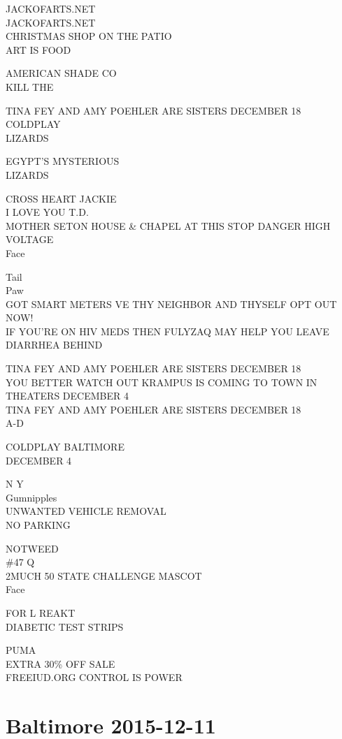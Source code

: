 \documentclass[10pt,letterpaper]{article}
\begin{document}
JACKOFARTS.NET\\
JACKOFARTS.NET\\
CHRISTMAS SHOP ON THE PATIO\\
ART IS FOOD

AMERICAN SHADE CO\\
KILL THE

TINA FEY AND AMY POEHLER ARE SISTERS DECEMBER 18\\
COLDPLAY\\
LIZARDS

EGYPT'S MYSTERIOUS\\
LIZARDS

CROSS HEART JACKIE\\
I LOVE YOU T.D.\\
MOTHER SETON HOUSE \& CHAPEL AT THIS STOP DANGER HIGH VOLTAGE\\
Face

Tail\\
Paw\\
GOT SMART METERS VE THY NEIGHBOR AND THYSELF OPT OUT NOW!\\
IF YOU'RE ON HIV MEDS THEN FULYZAQ MAY HELP YOU LEAVE DIARRHEA BEHIND

TINA FEY AND AMY POEHLER ARE SISTERS DECEMBER 18\\
YOU BETTER WATCH OUT KRAMPUS IS COMING TO TOWN IN THEATERS DECEMBER 4\\
TINA FEY AND AMY POEHLER ARE SISTERS DECEMBER 18\\
A{-}D

COLDPLAY BALTIMORE\\
DECEMBER 4

N Y\\
Gumnipples\\
UNWANTED VEHICLE REMOVAL\\
NO PARKING

NOTWEED\\
\#47 Q\\
2MUCH 50 STATE CHALLENGE MASCOT\\
Face

FOR L REAKT\\
DIABETIC TEST STRIPS

PUMA\\
EXTRA 30\% OFF SALE\\
FREEIUD.ORG CONTROL IS POWER
\pagebreak

\section*{Baltimore 2015-12-11}
\end{document}
